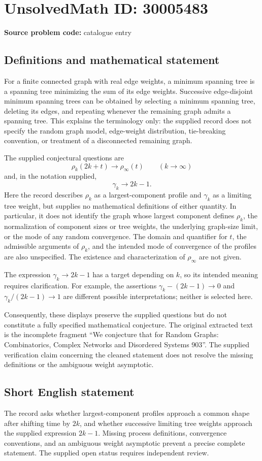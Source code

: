\documentclass[11pt]{article}
\begin{document}
\section*{UnsolvedMath ID: 30005483}
\textbf{Source problem code:} catalogue entry
\subsection{Definitions and mathematical statement}
For a finite connected graph with real edge weights, a minimum spanning tree is a spanning tree minimizing the sum of its edge weights. Successive edge-disjoint minimum spanning trees can be obtained by selecting a minimum spanning tree, deleting its edges, and repeating whenever the remaining graph admits a spanning tree. This explains the terminology only: the supplied record does not specify the random graph model, edge-weight distribution, tie-breaking convention, or treatment of a disconnected remaining graph.

The supplied conjectural questions are
\[
\rho_k(2k+t)\longrightarrow\rho_\infty(t)
\qquad (k\to\infty)
\]
and, in the notation supplied,
\[
\gamma_k\longrightarrow 2k-1.
\]
Here the record describes \(\rho_k\) as a largest-component profile and \(\gamma_k\) as a limiting tree weight, but supplies no mathematical definitions of either quantity. In particular, it does not identify the graph whose largest component defines \(\rho_k\), the normalization of component sizes or tree weights, the underlying graph-size limit, or the mode of any random convergence. The domain and quantifier for \(t\), the admissible arguments of \(\rho_k\), and the intended mode of convergence of the profiles are also unspecified. The existence and characterization of \(\rho_\infty\) are not given.

The expression \(\gamma_k\to 2k-1\) has a target depending on \(k\), so its intended meaning requires clarification. For example, the assertions \(\gamma_k-(2k-1)\to0\) and \(\gamma_k/(2k-1)\to1\) are different possible interpretations; neither is selected here.

Consequently, these displays preserve the supplied questions but do not constitute a fully specified mathematical conjecture. The original extracted text is the incomplete fragment ``We conjecture that for Random Graphs: Combinatorics, Complex Networks and Disordered Systems 903''. The supplied verification claim concerning the cleaned statement does not resolve the missing definitions or the ambiguous weight asymptotic.
\subsection{Short English statement}
The record asks whether largest-component profiles approach a common shape after shifting time by \(2k\), and whether successive limiting tree weights approach the supplied expression \(2k-1\). Missing process definitions, convergence conventions, and an ambiguous weight asymptotic prevent a precise complete statement. The supplied open status requires independent review.
\end{document}
